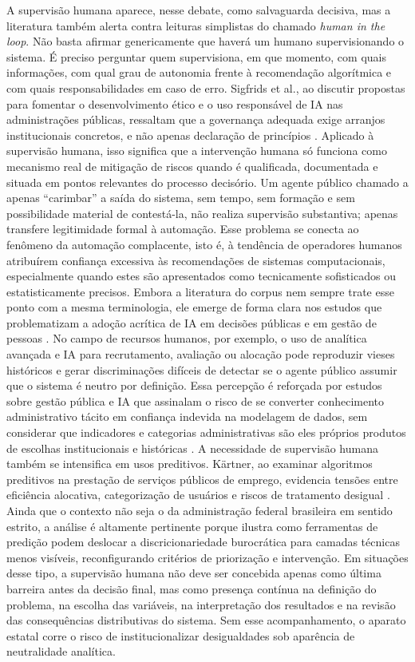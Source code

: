 \documentclass[12pt,a4paper]{article}
\begin{document}
A supervisão humana aparece, nesse debate, como salvaguarda decisiva, mas a literatura também alerta contra leituras simplistas do chamado \emph{human in the loop}. Não basta afirmar genericamente que haverá um humano supervisionando o sistema. É preciso perguntar quem supervisiona, em que momento, com quais informações, com qual grau de autonomia frente à recomendação algorítmica e com quais responsabilidades em caso de erro. Sigfrids et al., ao discutir propostas para fomentar o desenvolvimento ético e o uso responsável de IA nas administrações públicas, ressaltam que a governança adequada exige arranjos institucionais concretos, e não apenas declaração de princípios \autocite{sigfrids2022how}. Aplicado à supervisão humana, isso significa que a intervenção humana só funciona como mecanismo real de mitigação de riscos quando é qualificada, documentada e situada em pontos relevantes do processo decisório. Um agente público chamado a apenas “carimbar” a saída do sistema, sem tempo, sem formação e sem possibilidade material de contestá-la, não realiza supervisão substantiva; apenas transfere legitimidade formal à automação.
Esse problema se conecta ao fenômeno da automação complacente, isto é, à tendência de operadores humanos atribuírem confiança excessiva às recomendações de sistemas computacionais, especialmente quando estes são apresentados como tecnicamente sofisticados ou estatisticamente precisos. Embora a literatura do corpus nem sempre trate esse ponto com a mesma terminologia, ele emerge de forma clara nos estudos que problematizam a adoção acrítica de IA em decisões públicas e em gestão de pessoas \autocite{cho2023human} \autocite{chilunjika2022artificial} \autocite{barros2025inteligencia}. No campo de recursos humanos, por exemplo, o uso de analítica avançada e IA para recrutamento, avaliação ou alocação pode reproduzir vieses históricos e gerar discriminações difíceis de detectar se o agente público assumir que o sistema é neutro por definição. Essa percepção é reforçada por estudos sobre gestão pública e IA que assinalam o risco de se converter conhecimento administrativo tácito em confiança indevida na modelagem de dados, sem considerar que indicadores e categorias administrativas são eles próprios produtos de escolhas institucionais e históricas \autocite{chilunjika2022artificial} \autocite{cho2023human}.
A necessidade de supervisão humana também se intensifica em usos preditivos. Kärtner, ao examinar algoritmos preditivos na prestação de serviços públicos de emprego, evidencia tensões entre eficiência alocativa, categorização de usuários e riscos de tratamento desigual \autocite{krtner2021predictive}. Ainda que o contexto não seja o da administração federal brasileira em sentido estrito, a análise é altamente pertinente porque ilustra como ferramentas de predição podem deslocar a discricionariedade burocrática para camadas técnicas menos visíveis, reconfigurando critérios de priorização e intervenção. Em situações desse tipo, a supervisão humana não deve ser concebida apenas como última barreira antes da decisão final, mas como presença contínua na definição do problema, na escolha das variáveis, na interpretação dos resultados e na revisão das consequências distributivas do sistema. Sem esse acompanhamento, o aparato estatal corre o risco de institucionalizar desigualdades sob aparência de neutralidade analítica.
\end{document}
